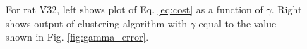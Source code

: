 \documentclass[superscriptaddress, twocolumn, prl]{revtex4}
\begin{document}
\begin{figure}
\centering
{}
\caption{For rat V32, left shows plot of Eq. \ref{eq:cost} as a function of $\gamma$. Right shows output of clustering algorithm with $\gamma$ equal to the value shown in Fig. \ref{fig:gamma_error}.}
\end{figure}
\end{document}
